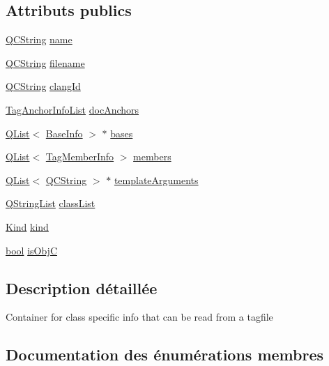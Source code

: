 \subsection*{Attributs publics}
\begin{DoxyCompactItemize}
\item 
\hyperlink{class_q_c_string}{Q\+C\+String} \hyperlink{class_tag_class_info_a79d7786b7290613addec8ad9e5a395e4}{name}
\item 
\hyperlink{class_q_c_string}{Q\+C\+String} \hyperlink{class_tag_class_info_a6cd5acb814b8cacb3521a8702591e670}{filename}
\item 
\hyperlink{class_q_c_string}{Q\+C\+String} \hyperlink{class_tag_class_info_ad188dbbabd08fdb1e2c31bd1886c2c0e}{clang\+Id}
\item 
\hyperlink{class_tag_anchor_info_list}{Tag\+Anchor\+Info\+List} \hyperlink{class_tag_class_info_a9afef69d35cafd8cd8517cb86c6c9aa7}{doc\+Anchors}
\item 
\hyperlink{class_q_list}{Q\+List}$<$ \hyperlink{struct_base_info}{Base\+Info} $>$ $\ast$ \hyperlink{class_tag_class_info_a809c36b15edd5f67a9722ee088ad266c}{bases}
\item 
\hyperlink{class_q_list}{Q\+List}$<$ \hyperlink{class_tag_member_info}{Tag\+Member\+Info} $>$ \hyperlink{class_tag_class_info_a010128f2ab7efcbc44492d4163e80bf8}{members}
\item 
\hyperlink{class_q_list}{Q\+List}$<$ \hyperlink{class_q_c_string}{Q\+C\+String} $>$ $\ast$ \hyperlink{class_tag_class_info_adfe7ae86150e4eeff7f7e8817fc171ff}{template\+Arguments}
\item 
\hyperlink{class_q_string_list}{Q\+String\+List} \hyperlink{class_tag_class_info_a04cfdb8cc5bf903eada7770d675038af}{class\+List}
\item 
\hyperlink{class_tag_class_info_accc1e7a47f78728ae2d5da7b06a1244e}{Kind} \hyperlink{class_tag_class_info_aec6fc8257dce19a4ff40e968ce3a7b8b}{kind}
\item 
\hyperlink{qglobal_8h_a1062901a7428fdd9c7f180f5e01ea056}{bool} \hyperlink{class_tag_class_info_a0814ea347ddb07527c3c6481edd3be4c}{is\+Obj\+C}
\end{DoxyCompactItemize}


\subsection{Description détaillée}
Container for class specific info that can be read from a tagfile 

\subsection{Documentation des énumérations membres}
\hypertarget{class_tag_class_info_accc1e7a47f78728ae2d5da7b06a1244e}{}
